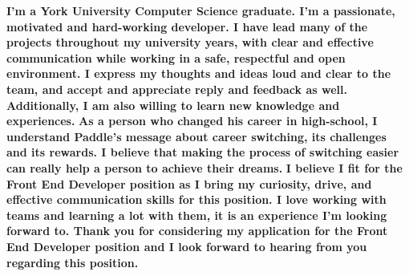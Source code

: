 \documentclass[11pt, a4paper]{awesome-cv}
\begin{document}
\makecvheader[R]

\makecvfooter
  {}
  {}
  {}

\makelettertitle

\begin{cvletter}

\textbf{I'm a York University Computer Science graduate. I'm a passionate, motivated and hard-working developer. I have lead many of  the projects throughout my university years, with clear and effective communication while working in a safe, respectful and open environment. I express my thoughts and ideas loud and clear to the team, and accept and appreciate reply and feedback as well. Additionally, I am also willing to learn new knowledge and experiences.
}
\textbf{As a person who changed his career in high-school, I understand Paddle's message about career switching, its challenges and its rewards. I believe that making the process of switching easier can really help a person to achieve their dreams.
}
\textbf{I believe I fit for the Front End Developer position as I bring my curiosity, drive, and effective communication skills for this position. I love working with teams and learning a lot with them, it is an experience I'm looking forward to. Thank you for considering my application for the Front End Developer position and I look forward to hearing from you regarding this position.
}
\end{cvletter}


\makeletterclosing
\end{document}
